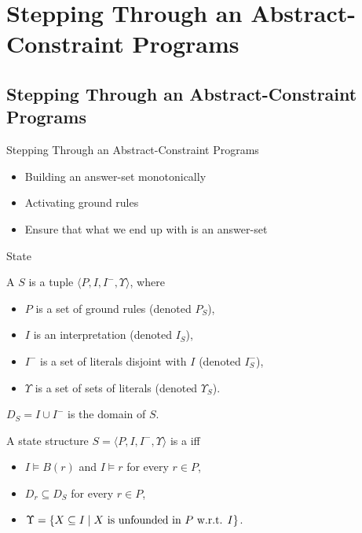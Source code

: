 \documentclass[trans,draft]{beamer} %
\begin{document}
\section[Advanced Stepping]{Stepping Through an Abstract-Constraint Programs}


\subsection[Advanced Stepping]{Stepping Through an Abstract-Constraint Programs}

\begin{frame}{Stepping Through an Abstract-Constraint Programs}

	\begin{itemize}
		\item Building an answer-set monotonically
		\item Activating ground rules
		\item Ensure that what we end up with is an answer-set
	\end{itemize}

\end{frame}

\begin{frame}{State}

	\begin{definition}
	A \emph{} $S$ is a tuple $\langle P, I, I^-, \Upsilon \rangle$, where
	\begin{itemize}
		\item $P$ is a set of ground rules (denoted $P_S$),
		\item $I$ is an interpretation (denoted $I_S$),
		\item $I^-$ is a set of literals disjoint with $I$ (denoted $I^-_S$),
		\item $\Upsilon$ is a set of sets of literals (denoted $\Upsilon_S$).
	\end{itemize}
	$D_S = I \cup I^-$ is the domain of $S$.
	\end{definition}

	\pause

	\begin{definition}[state]
	A state structure $S = \langle P, I, I^-, \Upsilon \rangle$ is a \emph{} iff
	\begin{itemize}
		\item $I \models B(r)$ and $I \models r$ for every $r \in P$,
		\item $D_r \subseteq D_S$ for every $r \in P$,
		\item $\Upsilon = \{X \subseteq I \mid X\text{ is unfounded in }P\text{ w.r.t. }I\}$.
	\end{itemize}
	\end{definition}

\end{frame}
\end{document}
